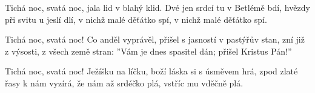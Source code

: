 \IncludeLilypond

Tichá noc, svatá noc,
jala lid v blahý klid.
Dvé jen srdcí tu v Betlémě bdí,
hvězdy při svitu u jeslí dlí,
v nichž malé děťátko spí,
v nichž malé děťátko spí.

Tichá noc, svatá noc!
Co anděl vyprávěl,
přišel s jasností v pastýřův stan,
zní již z výsosti, z všech země stran:
''Vám je dnes spasitel dán;
přišel Kristus Pán!''

Tichá noc, svatá noc!
Ježíšku na líčku,
boží láska si s úsměvem hrá,
zpod zlaté řasy k nám vyzírá,
že nám až srdéčko plá,
vstříc mu vděčně plá.
